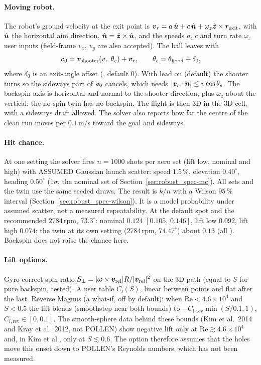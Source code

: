 \paragraph{Moving robot.} The robot's ground velocity at the exit point is
$\bm{v}_r=a\,\hat{\bm{u}}+c\,\hat{\bm{n}}+\omega_z\hat{\bm{z}}\times\bm{r}_{\text{exit}}$,
with $\hat{\bm{u}}$ the horizontal aim direction, $\hat{\bm{n}}=\hat{\bm{z}}\times\hat{\bm{u}}$, and the
speeds $a$, $c$ and turn rate $\omega_z$ user inputs (field-frame $v_x$, $v_y$ are also accepted). The ball
leaves with
\begin{equation}
  \vect{v}_0=\vect{v}_{\text{shooter}}(v,\ \theta_e)+\vect{v}_r,\qquad \theta_e=\theta_{\text{hood}}+\delta_0,
  \label{eq:field-move}
\end{equation}
where $\delta_0$ is an exit-angle offset (\assumed, default $0$). With lead on (default) the shooter turns so the
sideways part of $\bm{v}_0$ cancels, which needs $|\bm{v}_r\cdot\hat{\bm{n}}|\le v\cos\theta_e$. The
backspin axis is horizontal and normal to the shooter direction, plus $\omega_z$ about the vertical; the
no-spin twin has no backspin. The flight is then 3D in the 3D cell, with a sideways draft allowed. The solver
also reports how far the centre of the clean run moves per $0.1$\,m/s toward the goal and sideways.

\paragraph{Hit chance.} At one setting the solver fires $n=1000$ shots per aero set (lift low, nominal and
high) with ASSUMED Gaussian launch scatter: speed $1.5\,\%$, elevation $0.40^\circ$, heading $0.50^\circ$
($1\sigma$, the nominal set of Section~\ref{sec:robust_spec-mc}). All sets and the twin use the same seeded
draws. The result is $k/n$ with a Wilson $95\,\%$ interval (Section~\ref{sec:robust_spec-wilson}). It is a
model probability under assumed scatter, not a measured repeatability. At the default spot and the recommended
$2784$\,rpm, $73.3^\circ$: nominal $0.124$ $[0.105,\,0.146]$, lift low $0.092$, lift high $0.074$; the twin
at its own setting ($2784$\,rpm, $74.47^\circ$) about $0.13$ (all \predicted). Backspin does not raise the
chance here.

\paragraph{Lift options.} Gyro-correct spin ratio $S_\perp=|\bm{\omega}\times\bm{v}_{\text{rel}}|R/
|\bm{v}_{\text{rel}}|^2$ on the 3D path (equal to $S$ for pure backspin, tested). A user table $C_l(S)$,
linear between points and flat after the last. Reverse Magnus (a what-if, off by default): when
$\mathrm{Re}<4.6\times10^4$\assumed{} and $S<0.5$\assumed{} the lift blends (smoothstep near both bounds) to
$-C_{l,\text{rev}}\min(S/0.1,1)$, $C_{l,\text{rev}}\in[0,0.1]$\assumed. The smooth-sphere data behind
these bounds (Kim et al.\ 2014 and Kray et al.\ 2012, not POLLEN) show negative lift only at
$\mathrm{Re}\gtrsim4.6\times10^4$\assumed{} and, in Kim et al., only at $S\lesssim0.6$\assumed. The option
therefore assumes that the holes move this onset down to POLLEN's Reynolds numbers, which has not been
measured.

